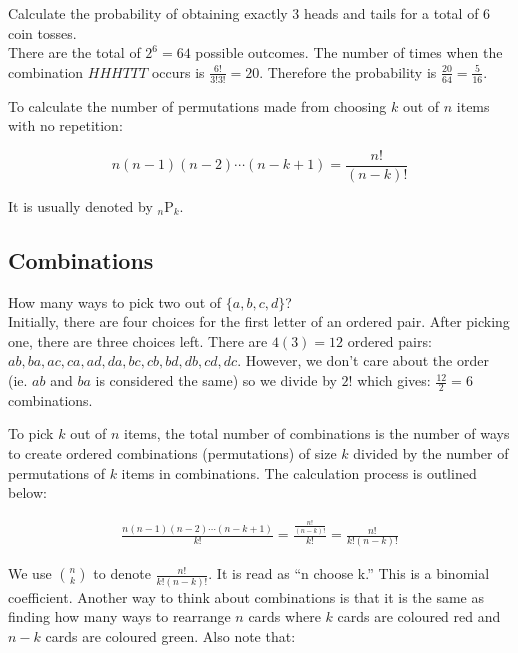 \documentclass[12pt, a4paper]{article}
\newcounter{exa}
\begin{document}
\begin{texample}
Calculate the probability of obtaining exactly $3$ heads and tails for a total of 6 coin tosses. \\

There are the total of $2^6=64$ possible outcomes. The number of times when the combination $HHHTTT$ occurs is $\frac{6!}{3!3!}=20$. Therefore the probability is $\frac{20}{64}=\frac{5}{16}$.
\end{texample}

To calculate the number of permutations made from choosing $k$ out of $n$ items with no repetition:

$$n(n-1)(n-2) \cdots (n-k+1)=\frac{n!}{(n-k)!}$$

It is usually denoted by ${}_n \mathrm{P}_k$.

\subsection{Combinations}

\begin{texample}
How many ways to pick two out of $\{a, b, c, d\}$? \\

Initially, there are four choices for the first letter of an ordered pair. After picking one, there are three choices left. There are $4(3)=12$ ordered pairs: $ab, ba, ac, ca, ad, da, bc, cb, bd, db, cd, dc$. However, we don't care about the order (ie. $ab$ and $ba$ is considered the same) so we divide by $2!$ which gives: $\frac{12}{2}=6$ combinations.
\end{texample}

To pick $k$ out of $n$ items, the total number of combinations is the number of ways to create ordered combinations (permutations) of size $k$ divided by the number of permutations of $k$ items in combinations. The calculation process is outlined below:

\begin{align*}
\frac{n(n-1)(n-2) \cdots (n-k+1)}{k!} = \frac{\frac{n!}{(n-k)!}}{k!} = \frac{n!}{k!(n-k)!}
\end{align*}

We use $\binom{n}{k}$ to denote $\frac{n!}{k!(n-k)!}$. It is read as ``n choose k.'' This is a binomial coefficient. Another way to think about combinations is that it is the same as finding how many ways to rearrange $n$ cards where $k$ cards are coloured red and $n-k$ cards are coloured green. Also note that:
\end{document}
